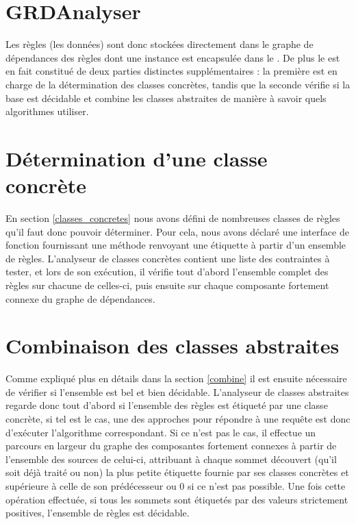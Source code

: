 


\section{GRDAnalyser}\label{impl_grd_analyser}
Les règles (les données) sont donc stockées directement dans le graphe de dépendances des
règles dont une instance est encapsulée dans le \grdanalyser.
De plus le \grdanalyser est en fait constitué de deux parties distinctes supplémentaires
: la première est en charge de la détermination des classes concrètes, tandis que la
seconde vérifie si la base est décidable et combine les classes
abstraites de manière à savoir quels algorithmes utiliser.

\section{Détermination d'une classe concrète}\label{impl_classe_concrete}
En section \ref{classes_concretes} nous avons défini de nombreuses classes de règles
qu'il faut donc pouvoir déterminer.
Pour cela, nous avons déclaré une interface de fonction 
fournissant une méthode renvoyant une étiquette à partir d'un ensemble de règles.
L'analyseur de classes concrètes contient une liste des contraintes à tester, et lors de
son exécution, il vérifie tout d'abord l'ensemble complet des règles sur chacune de
celles-ci, puis ensuite sur chaque composante fortement connexe du graphe de dépendances.

\section{Combinaison des classes abstraites}\label{impl_combine}
Comme expliqué plus en détails dans la section \ref{combine} il est ensuite
nécessaire de vérifier si l'ensemble est bel et bien décidable.
L'analyseur de classes abstraites regarde donc tout d'abord si l'ensemble des règles est
étiqueté par une classe concrète, si tel est le cas, une des approches pour répondre à
une requête est donc d'exécuter l'algorithme correspondant.
Si ce n'est pas le cas, il effectue un parcours  en largeur du graphe des 
composantes fortement connexes à partir de l'ensemble des sources de celui-ci, attribuant à
chaque sommet découvert (qu'il soit déjà traité ou non) la plus petite étiquette
fournie par ses classes concrètes et supérieure à celle de son prédécesseur ou 0 si 
ce n'est pas possible.
Une fois cette opération effectuée, si tous les sommets sont étiquetés par des valeurs 
strictement positives, l'ensemble de règles est décidable.


